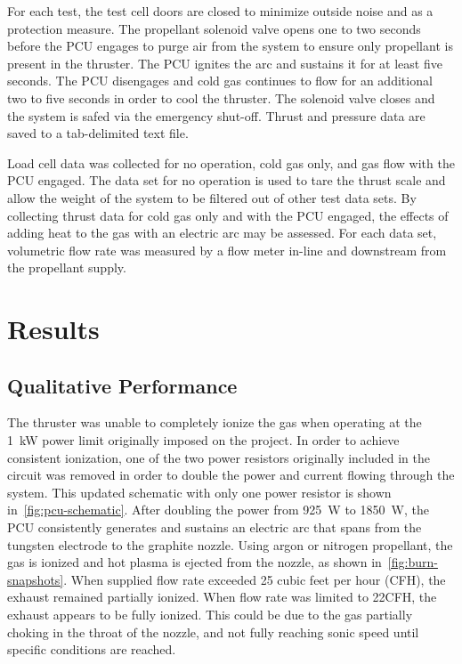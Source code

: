 \documentclass[journal]{IEEEtran}
\begin{document}
For each test, the test cell doors are closed to minimize outside noise and as a protection measure.
The propellant solenoid valve opens one to two seconds before the PCU engages to purge air from the system to ensure only propellant is present in the thruster.
The PCU ignites the arc and sustains it for at least five seconds.
The PCU disengages and cold gas continues to flow for an additional two to five seconds in order to cool the thruster.
The solenoid valve closes and the system is safed via the emergency shut-off.
Thrust and pressure data are saved to a tab-delimited text file.

Load cell data was collected for no operation, cold gas only, and gas flow with the PCU engaged.
The data set for no operation is used to tare the thrust scale and allow the weight of the system to be filtered out of other test data sets.
By collecting thrust data for cold gas only and with the PCU engaged, the effects of adding heat to the gas with an electric arc may be assessed.
For each data set, volumetric flow rate was measured by a flow meter in-line and downstream from the propellant supply.

\section{Results}
\subsection{Qualitative Performance}
The thruster was unable to completely ionize the gas when operating at the \SI{1}{\kilo\watt} power limit originally imposed on the project. In order to achieve consistent ionization, one of the two power resistors originally included in the circuit was removed in order to double the power and current flowing through the system. This updated schematic with only one power resistor is shown in~\autoref{fig:pcu-schematic}. After doubling the power from \SI{925}{\watt} to \SI{1850}{\watt}, the PCU consistently generates and sustains an electric arc that spans from the tungsten electrode to the graphite nozzle.
Using argon or nitrogen propellant, the gas is ionized and hot plasma is ejected from the nozzle, as shown in~\autoref{fig:burn-snapshots}.
When supplied flow rate exceeded 25 cubic feet per hour (CFH), the exhaust remained partially ionized.
When flow rate was limited to 22\si{CFH}, the exhaust appears to be fully ionized.
This could be due to the gas partially choking in the throat of the nozzle, and not fully reaching sonic speed until specific conditions are reached.
\end{document}
